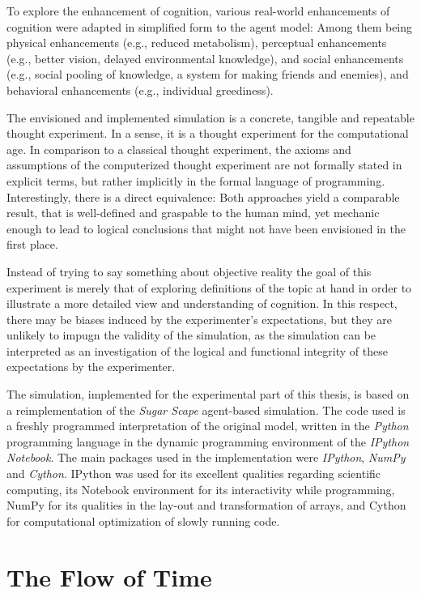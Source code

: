 To explore the enhancement of cognition, various real-world enhancements of cognition were adapted in simplified form to the agent model: Among them being physical enhancements (e.g., reduced metabolism), perceptual enhancements (e.g., better vision, delayed environmental knowledge), and social enhancements (e.g., social pooling of knowledge, a system for making friends and enemies), and behavioral enhancements (e.g., individual greediness).

The envisioned and implemented simulation is a concrete, tangible and repeatable thought experiment. In a sense, it is a thought experiment for the computational age. In comparison to a classical thought experiment, the axioms and assumptions of the computerized thought experiment are not formally stated in explicit terms, but rather implicitly in the formal language of programming. Interestingly, there is a direct equivalence: Both approaches yield a comparable result, that is well-defined and graspable to the human mind, yet mechanic enough to lead to logical conclusions that might not have been envisioned in the first place.

Instead of trying to say something about objective reality the goal of this experiment is merely that of exploring definitions of the topic at hand in order to illustrate a more detailed view and understanding of cognition. In this respect, there may be biases induced by the experimenter's expectations, but they are unlikely to impugn the validity of the simulation, as the simulation can be interpreted as an investigation of the logical and functional integrity of these expectations by the experimenter.

The simulation, implemented for the experimental part of this thesis, is based on a reimplementation of the \textit{Sugar Scape} agent-based simulation. The code used is a freshly programmed interpretation of the original model, written in the \textit{Python} programming language in the dynamic programming environment of the \textit{IPython Notebook}. The main packages used in the implementation were \textit{IPython}, \textit{NumPy} and \textit{Cython}. IPython was used for its excellent qualities regarding scientific computing, its Notebook environment for its interactivity while programming, NumPy for its qualities in the lay-out and transformation of arrays, and Cython for computational optimization of slowly running code.

\section{The Flow of Time}


